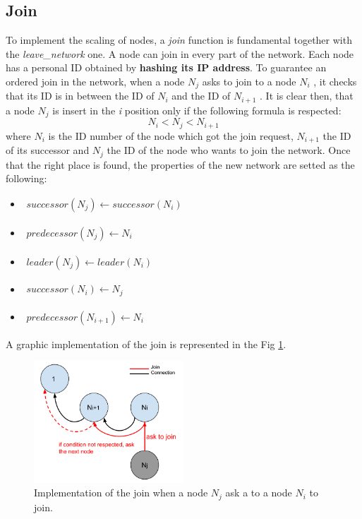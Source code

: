 \documentclass[11pt,conference]{IEEEtran}
\begin{document}
\subsection{Join}
To implement the scaling of nodes, a \textit{join} function is fundamental together with the \textit{leave\_network} one. A node can join in every part of the network. Each node has a personal ID obtained by \textbf{hashing its IP address}. To guarantee an ordered join in the network, when a node $N_j$ asks to join to a node $N_i$ , it checks that its ID is in between the ID of $N_i$ and the ID of $N_{i+1}$ .
\newline
It is clear then, that a node $N_j$ is insert in the \textit{i} position only if the following formula is respected:
\[
N_{i} < N_j < N_{i+1}
\]
where $N_i$ is the ID number of the node which got the join request, $N_{i+1}$ the ID of its successor and $N_{j}$ the ID of the node who wants to join the network. Once that the right place is found, the properties of the new network are setted as the following:
\begin{itemize}
\item[] $\begin{aligned}
    successor(N_j) \leftarrow successor(N_i)
\end{aligned}$
\item[] $\begin{aligned}
    predecessor(N_j) \leftarrow N_i
\end{aligned}$
\item[] $\begin{aligned}
    leader(N_j) \leftarrow leader(N_i)
\end{aligned}$
\item[] $\begin{aligned}
    successor(N_i) \leftarrow N_j
\end{aligned}$
\item[] $\begin{aligned}
    predecessor(N_{i+1}) \leftarrow N_i
\end{aligned}$
\end{itemize}
A graphic implementation of the join is represented in the Fig \ref{fig:join}.
\begin{figure}[h!]
  \centering
    \includegraphics[width=0.5\textwidth]{join}
    \caption{Implementation of the join when a node $N_j$ ask a to a node $N_i$ to join.}
    \label{fig:join}
\end{figure}
\end{document}

